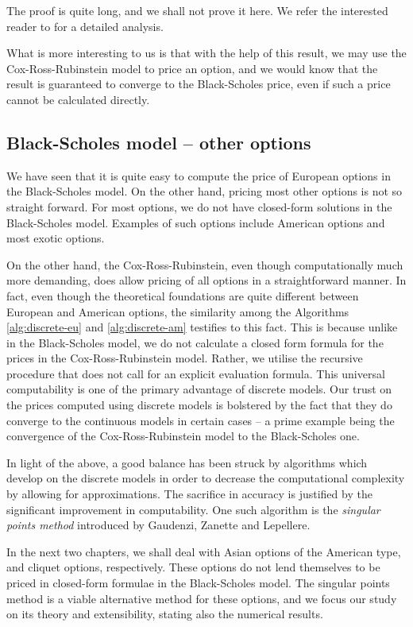 The proof is quite long, and we shall not prove it here. We refer the interested reader to \cite{He1989} for a detailed analysis.

What is more interesting to us is that with the help of this result, we may use the Cox-Ross-Rubinstein model to price an option, and we would know that the result is guaranteed to converge to the Black-Scholes price, even if such a price cannot be calculated directly.


\subsection{Black-Scholes model -- other options}
\label{subsec:continuous-other}

We have seen that it is quite easy to compute the price of European options in the Black-Scholes model. On the other hand, pricing most other options is not so straight forward. For most options, we do not have closed-form solutions in the Black-Scholes model. Examples of such options include American options and most exotic options.

On the other hand, the Cox-Ross-Rubinstein, even though computationally much more demanding, does allow pricing of all options in a straightforward manner. In fact, even though the theoretical foundations are quite different between European and American options, the similarity among the Algorithms \ref{alg:discrete-eu} and \ref{alg:discrete-am} testifies to this fact. This is because unlike in the Black-Scholes model, we do not calculate a closed form formula for the prices in the Cox-Ross-Rubinstein model. Rather, we utilise the recursive procedure that does not call for an explicit evaluation formula. This universal computability is one of the primary advantage of discrete models. Our trust on the prices computed using discrete models is bolstered by the fact that they do converge to the continuous models in certain cases -- a prime example being the convergence of the Cox-Ross-Rubinstein model to the Black-Scholes one.

In light of the above, a good balance has been struck by algorithms which develop on the discrete models in order to decrease the computational complexity by allowing for approximations. The sacrifice in accuracy is justified by the significant improvement in computability. One such algorithm is the \emph{singular points method} introduced by Gaudenzi, Zanette and Lepellere.

In the next two chapters, we shall deal with Asian options of the American type, and cliquet options, respectively. These options do not lend themselves to be priced in closed-form formulae in the Black-Scholes model. The singular points method is a viable alternative method for these options, and we focus our study on its theory and extensibility, stating also the numerical results.



